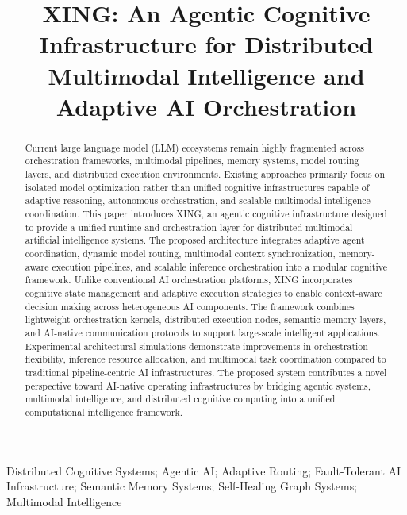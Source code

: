\documentclass[conference]{IEEEtran}
\title{XING: An Agentic Cognitive Infrastructure for Distributed Multimodal Intelligence and Adaptive AI Orchestration}
\author{
    \IEEEauthorblockN{Fernando M. F.$\dagger$}
    \IEEEauthorblockA{$\dagger$Corresponding Author\\
    IPN UPIITA $|$ BUAA\\
    fmayf1500@alumno.ipn.mx}
    \and
    \IEEEauthorblockN{NEXUS Research Institute\\
    Department of Cognitive Infrastructures}
}
\begin{document}
\maketitle

\begin{abstract}
Current large language model (LLM) ecosystems remain highly fragmented across orchestration frameworks, multimodal pipelines, memory systems, model routing layers, and distributed execution environments. Existing approaches primarily focus on isolated model optimization rather than unified cognitive infrastructures capable of adaptive reasoning, autonomous orchestration, and scalable multimodal intelligence coordination. This paper introduces XING, an agentic cognitive infrastructure designed to provide a unified runtime and orchestration layer for distributed multimodal artificial intelligence systems. The proposed architecture integrates adaptive agent coordination, dynamic model routing, multimodal context synchronization, memory-aware execution pipelines, and scalable inference orchestration into a modular cognitive framework. Unlike conventional AI orchestration platforms, XING incorporates cognitive state management and adaptive execution strategies to enable context-aware decision making across heterogeneous AI components. The framework combines lightweight orchestration kernels, distributed execution nodes, semantic memory layers, and AI-native communication protocols to support large-scale intelligent applications. Experimental architectural simulations demonstrate improvements in orchestration flexibility, inference resource allocation, and multimodal task coordination compared to traditional pipeline-centric AI infrastructures. The proposed system contributes a novel perspective toward AI-native operating infrastructures by bridging agentic systems, multimodal intelligence, and distributed cognitive computing into a unified computational intelligence framework.
\end{abstract}

\begin{IEEEkeywords}
Distributed Cognitive Systems; Agentic AI; Adaptive Routing; Fault-Tolerant AI Infrastructure; Semantic Memory Systems; Self-Healing Graph Systems; Multimodal Intelligence
\end{IEEEkeywords}

\end{document}
